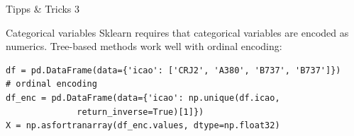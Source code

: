 \documentclass[a4paper,presentation]{beamer}
\begin{document}
\begin{frame}[fragile]{Tipps \& Tricks 3}
  \begin{block}{Categorical variables}
     {\footnotesize Sklearn requires that categorical variables are encoded as numerics. Tree-based methods work well with ordinal encoding: }
     \begin{verbatim}
df = pd.DataFrame(data={'icao': ['CRJ2', 'A380', 'B737', 'B737']})
# ordinal encoding
df_enc = pd.DataFrame(data={'icao': np.unique(df.icao,
              return_inverse=True)[1]})
X = np.asfortranarray(df_enc.values, dtype=np.float32)
     \end{verbatim}
  \end{block}
\end{frame}


\end{document}
